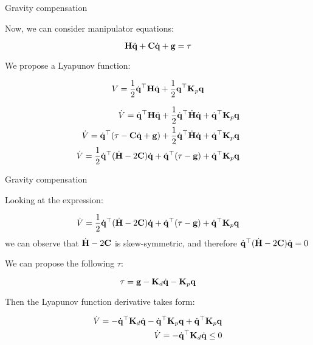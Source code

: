 \documentclass{beamer}
\begin{document}
\begin{frame}{Gravity compensation}
	\begin{flushleft}
		
		Now, we can consider manipulator equations:
		
		\begin{equation}
			\mathbf{H} \ddot{\mathbf{q}} + \mathbf{C} \dot{\mathbf{q}} + \mathbf{g} = \tau
		\end{equation}
	
		We propose a Lyapunov function:
		 
\begin{equation}
	V = \frac{1}{2} \dot{\mathbf{q}}^\top  \mathbf{H} \dot{\mathbf{q}} + 
	\frac{1}{2} \mathbf{q}^\top \mathbf{K}_p\mathbf{q}
\end{equation}		
		
	\begin{align}
	\dot V = \dot{\mathbf{q}}^\top  \mathbf{H}  \ddot{\mathbf{q}} + 
	\frac{1}{2} \dot{\mathbf{q}}^\top  \dot{\mathbf{H}} \dot{\mathbf{q}} +
	\dot{\mathbf{q}}^\top \mathbf{K}_p \mathbf{q} 
	\\
	\dot V = \dot{\mathbf{q}}^\top  (\tau - \mathbf{C} \dot{\mathbf{q}} + \mathbf{g} ) + 
	\frac{1}{2} \dot{\mathbf{q}}^\top  \dot{\mathbf{H}} \dot{\mathbf{q}} +
	\dot{\mathbf{q}}^\top \mathbf{K}_p \mathbf{q} 
	\\
	\dot V = \frac{1}{2} \dot{\mathbf{q}}^\top  ( \dot{\mathbf{H}} - 2 \mathbf{C} ) \dot{\mathbf{q}} +
	\dot{\mathbf{q}}^\top  (\tau - \mathbf{g} ) + 
	\dot{\mathbf{q}}^\top \mathbf{K}_p \mathbf{q} 
	\end{align}		
		
	\end{flushleft}
\end{frame}



\begin{frame}{Gravity compensation}
	\begin{flushleft}
		
		Looking at the expression: 
		
		$$\dot V = \frac{1}{2} \dot{\mathbf{q}}^\top  ( \dot{\mathbf{H}} - 2 \mathbf{C} ) \dot{\mathbf{q}} +
		\dot{\mathbf{q}}^\top  (\tau - \mathbf{g} ) + 
		\dot{\mathbf{q}}^\top \mathbf{K}_p \mathbf{q} $$ 
		we can observe that $ \dot{\mathbf{H}} - 2 \mathbf{C} $ is skew-symmetric, and therefore $\dot{\mathbf{q}}^\top  ( \dot{\mathbf{H}} - 2 \mathbf{C} ) \dot{\mathbf{q}} = 0$
		
		We can propose the following $\tau$:
		
		\begin{equation}
			\tau = \mathbf{g}  - \mathbf{K}_d \dot{\mathbf{q}}  - \mathbf{K}_p \mathbf{q}
		\end{equation}		
	
		Then the Lyapunov function derivative takes form:
		
	\begin{align}
	\dot V = 
	-\dot{\mathbf{q}}^\top  \mathbf{K}_d \dot{\mathbf{q}}
	-\dot{\mathbf{q}}^\top  \mathbf{K}_p \mathbf{q}
	 + 
	\dot{\mathbf{q}}^\top \mathbf{K}_p \mathbf{q} 
	\\
	\dot V = 
	-\dot{\mathbf{q}}^\top  \mathbf{K}_d \dot{\mathbf{q}} \leq 0
	\end{align}				
					
		
	\end{flushleft}
\end{frame}
\end{document}
